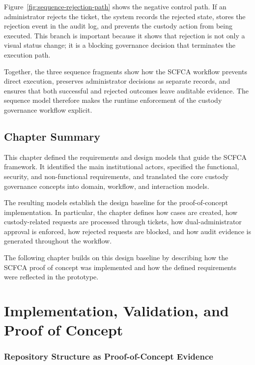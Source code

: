 \documentclass[12pt,a4paper]{report}
\begin{document}
Figure~\ref{fig:sequence-rejection-path} shows the negative control path. If an administrator
rejects the ticket, the system records the rejected state, stores the rejection event in the
audit log, and prevents the custody action from being executed. This branch is important
because it shows that rejection is not only a visual status change; it is a blocking governance
decision that terminates the execution path.

Together, the three sequence fragments show how the SCFCA workflow prevents direct
execution, preserves administrator decisions as separate records, and ensures that both
successful and rejected outcomes leave auditable evidence. The sequence model therefore
makes the runtime enforcement of the custody governance workflow explicit.

\section{Chapter Summary}
\label{sec:requirements-and-design-summary}

This chapter defined the requirements and design models that guide the SCFCA framework.
It identified the main institutional actors, specified the functional, security, and
non-functional requirements, and translated the core custody governance concepts into
domain, workflow, and interaction models.

The resulting models establish the design baseline for the proof-of-concept implementation.
In particular, the chapter defines how cases are created, how custody-related requests are
processed through tickets, how dual-administrator approval is enforced, how rejected
requests are blocked, and how audit evidence is generated throughout the workflow.

The following chapter builds on this design baseline by describing how the SCFCA proof of
concept was implemented and how the defined requirements were reflected in the prototype.



\chapter{Implementation, Validation, and Proof of Concept}

\label{ch:implementation-validation-poc}

\subsection*{Repository Structure as Proof-of-Concept Evidence}
\end{document}
